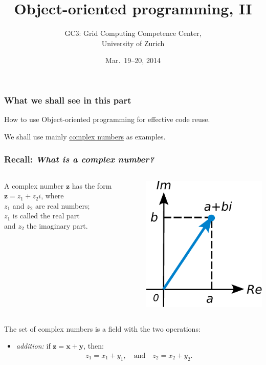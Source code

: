 \documentclass[english,serif,mathserif,xcolor=pdftex,dvipsnames,table]{beamer}
\title[OOP 2]{%
  Object-oriented programming, II
}
\author[GC3]{%
  GC3: Grid Computing Competence Center, \\
  University of Zurich
}
\date{Mar.~19--20, 2014}
\begin{document}
\maketitle


\begin{frame}
  \frametitle{What we shall see in this part}

  How to use Object-oriented programming for effective code reuse.

  \+
  We shall use mainly
  \href{http://mathworld.wolfram.com/ComplexNumber.html}{complex
    numbers} as examples.
\end{frame}


\begin{frame}
  \frametitle{Recall: \emph{What is a complex number?}}

  \begin{columns}
    \begin{column}{0.6\linewidth}
      \raggedleft
      A complex number $\mathbf{z}$ has the form $\mathbf{z} = z_1 + z_2i$, where \\
      $z_1$ and $z_2$ are real numbers; \\
      $z_1$ is called the real part \\
      and $z_2$ the imaginary part.
    \end{column}
    \begin{column}{0.4\linewidth}
      \centering
      \includegraphics[height=5\baselineskip]{fig/ComplexNumber}
    \end{column}
  \end{columns}

  \+
  The set of complex numbers is a field with the two operations:
  \begin{itemize}
  \item
    \emph{addition:} if $\mathbf{z} = \mathbf{x} + \mathbf{y}$,
    then:
    \begin{gather*}
      z_1 = x_1 + y_1, \quad \text{and} \quad z_2 = x_2 + y_2.
    \end{gather*}


\end{itemize}
\end{frame}
\end{document}
